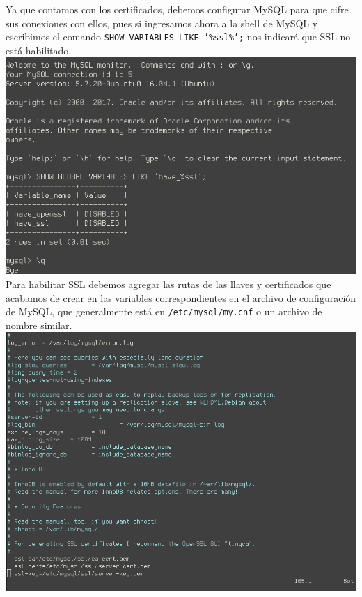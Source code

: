 \documentclass[9pt]{article}
\begin{document}
Ya que contamos con los certificados, debemos configurar \textsf{MySQL} para que cifre sus conexiones con ellos, pues si ingresamos ahora a la shell de \textsf{MySQL} y escribimos el comando \texttt{SHOW VARIABLES LIKE '\%ssl\%';} nos indicará que \textsf{SSL} no está habilitado. \\
\includegraphics[width=\textwidth]{mysql_ssl-disabled} \\

Para habilitar \textsf{SSL} debemos agregar las rutas de las llaves y certificados que acabamos de crear en las variables correspondientes en el archivo de configuración de \textsf{MySQL}, que generalmente está en \texttt{/etc/mysql/my.cnf} o un archivo de nombre similar. \\
\includegraphics[width=\textwidth]{mysql_conf-ssl}\\
\end{document}
